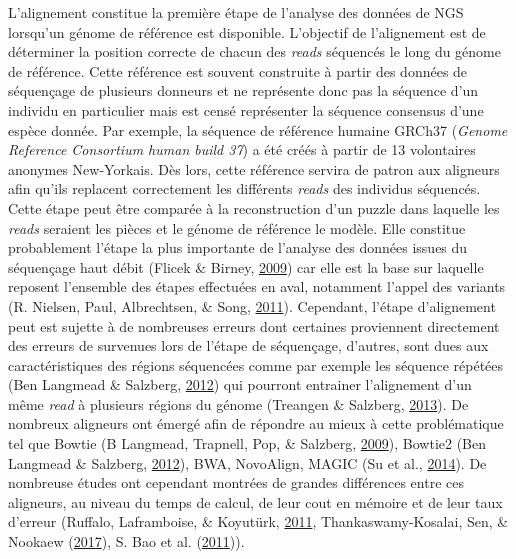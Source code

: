 \documentclass[12pt,twoside]{reedthesis}
\theoremstyle{definition}
\theoremstyle{definition}
\theoremstyle{remark}
\begin{document}
  L'alignement constitue la première étape de l'analyse des données de NGS
  lorsqu'un génome de référence est disponible. L'objectif de l'alignement
  est de déterminer la position correcte de chacun des \emph{reads}
  séquencés le long du génome de référence. Cette référence est souvent
  construite à partir des données de séquençage de plusieurs donneurs et
  ne représente donc pas la séquence d'un individu en particulier mais est
  censé représenter la séquence consensus d'une espèce donnée. Par
  exemple, la séquence de référence humaine GRCh37 (\emph{Genome Reference
  Consortium human build 37}) a été créés à partir de 13 volontaires
  anonymes New-Yorkais. Dès lors, cette référence servira de patron aux
  aligneurs afin qu'ils replacent correctement les différents \emph{reads}
  des individus séquencés. Cette étape peut être comparée à la
  reconstruction d'un puzzle dans laquelle les \emph{reads} seraient les
  pièces et le génome de référence le modèle. Elle constitue probablement
  l'étape la plus importante de l'analyse des données issues du séquençage
  haut débit (Flicek \& Birney, \protect\hyperlink{ref-Flicek2009}{2009})
  car elle est la base sur laquelle reposent l'ensemble des étapes
  effectuées en aval, notamment l'appel des variants (R. Nielsen, Paul,
  Albrechtsen, \& Song, \protect\hyperlink{ref-Nielsen2011}{2011}).
  Cependant, l'étape d'alignement peut est sujette à de nombreuses erreurs
  dont certaines proviennent directement des erreurs de survenues lors de
  l'étape de séquençage, d'autres, sont dues aux caractéristiques des
  régions séquencées comme par exemple les séquence répétées (Ben Langmead
  \& Salzberg, \protect\hyperlink{ref-Langmead2012}{2012}) qui pourront
  entrainer l'alignement d'un même \emph{read} à plusieurs régions du
  génome (Treangen \& Salzberg,
  \protect\hyperlink{ref-Treangen2013}{2013}). De nombreux aligneurs ont
  émergé afin de répondre au mieux à cette problématique tel que Bowtie (B
  Langmead, Trapnell, Pop, \& Salzberg,
  \protect\hyperlink{ref-Langmead2009}{2009}), Bowtie2 (Ben Langmead \&
  Salzberg, \protect\hyperlink{ref-Langmead2012}{2012}), BWA, NovoAlign,
  MAGIC (Su et al., \protect\hyperlink{ref-Su2014}{2014}). De nombreuse
  études ont cependant montrées de grandes différences entre ces
  aligneurs, au niveau du temps de calcul, de leur cout en mémoire et de
  leur taux d'erreur (Ruffalo, Laframboise, \& Koyutürk,
  \protect\hyperlink{ref-Ruffalo2011}{2011}, Thankaswamy-Kosalai, Sen, \&
  Nookaew (\protect\hyperlink{ref-Thankaswamy-Kosalai2017}{2017}), S. Bao
  et al. (\protect\hyperlink{ref-Bao2011}{2011})).
  
\end{document}
